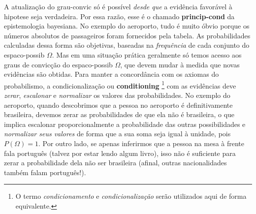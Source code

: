 \documentclass[./main.tex]{subfiles}
\begin{document}
\par A atualização do \gls{grau-convic} só é possível \textit{desde que} a evidência favorável à \gls{hipotese} seja verdadeira. Por essa razão, esse é o chamado \textbf{\gls{princip-cond}} da epistemologia bayesiana. No exemplo do aeroporto, tudo é muito óbvio porque os números absolutos de passageiros foram fornecidos pela tabela. As probabilidades calculadas dessa forma são objetivas, baseadas na \textit{frequência} de cada conjunto do \gls{espaco-possib} $\Omega$. Mas em uma situação prática geralmente só temos acesso aos graus de convicção do \gls{espaco-possib} $\Omega$, que devem mudar à medida que novas evidências são obtidas. Para manter a concordância com os axiomas do probabilismo, a condicionalização ou \textbf{\gls{conditioning}} \footnote{O termo \textit{condicionamento} e \textit{condicionalização} serão utilizados aqui de forma equivalente.} com as evidências deve \textit{zerar}, \textit{escalonar} e \textit{normalizar} os valores das probabilidades. No exemplo do aeroporto, quando descobrimos que a pessoa no aeroporto é definitivamente brasileira, devemos zerar as probabilidades de que ela não é brasileira, o que implica escalonar proporcionalmente a probabilidade das outras possibilidades e \textit{normalizar seus valores} de forma que a sua soma seja igual à unidade, pois $P(\Omega) = 1$. Por outro lado, se apenas inferirmos que a pessoa na mesa à frente fala português (talvez por estar lendo algum livro), isso não é suficiente para zerar a probabilidade dela não ser brasileira (afinal, outras nacionalidades também falam português!).
\end{document}
